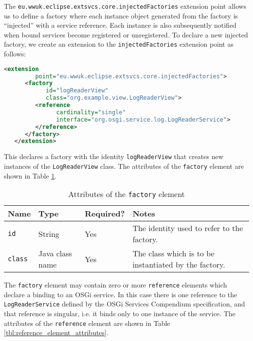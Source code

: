 \documentclass[12pt]{article}
\begin{document}
The \texttt{eu.wwuk.eclipse.extsvcs.core.injectedFactories} extension point
allows us to define a factory where each instance object generated from the
factory is ``injected'' with a service reference. Each instance is also
subsequently notified when bound services become registered or unregistered. To
declare a new injected factory, we create an extension to the
\texttt{injected\-Fac\-tories} extension point as follows:

\begin{lstlisting}[language=xml]
   <extension
         point="eu.wwuk.eclipse.extsvcs.core.injectedFactories">
      <factory
            id="logReaderView"
            class="org.example.view.LogReaderView">
         <reference
               cardinality="single"
               interface="org.osgi.service.log.LogReaderService">
         </reference>
      </factory>
   </extension>
\end{lstlisting}

This declares a factory with the identity \texttt{logReaderView} that creates new
instances of the \texttt{LogReaderView} class. The attributes of the
\texttt{factory} element are shown in Table \ref{tbl:factory_element_attributes}.

\begin{table}
	\centering
	\begin{tabular}{|l|l|l|p{6cm}|}
	\hline
	Name & Type & Required? & Notes \\
	\hline
	\texttt{id} & String & Yes & The identity used to refer to the factory. \\
	\hline
	\texttt{class} & Java class name & Yes & The class which is to be instantiated by the factory.\\
	\hline
	\end{tabular}
	\caption{Attributes of the \texttt{factory} element}
	\label{tbl:factory_element_attributes}
\end{table}

The \texttt{factory} element may contain zero or more \texttt{reference} elements which declare a binding to an OSGi service. In this case there is one reference to the \texttt{LogReaderService} defined by the OSGi Services Compendium specification, and that reference is singular, i.e. it binds only to one instance of the service. The attributes of the \texttt{reference} element are shown in Table \ref{tbl:reference_element_attributes}.
\end{document}
